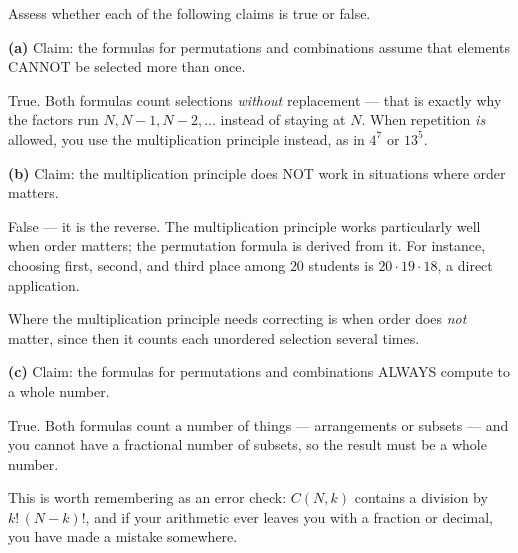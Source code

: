 \documentclass[12pt]{ximera}
\begin{document}
\begin{problem}
Assess whether each of the following claims is true or false.

\begin{prompt}
\textbf{(a)} Claim: the formulas for permutations and combinations assume that
elements CANNOT be selected more than once.

\begin{multipleChoice}
\end{multipleChoice}

\begin{feedback}
True. Both formulas count selections \emph{without} replacement --- that is exactly
why the factors run $N, N-1, N-2,\ldots$ instead of staying at $N$. When repetition
\emph{is} allowed, you use the multiplication principle instead, as in $4^7$ or
$13^5$.
\end{feedback}
\end{prompt}

\begin{prompt}
\textbf{(b)} Claim: the multiplication principle does NOT work in situations where
order matters.

\begin{multipleChoice}
\end{multipleChoice}

\begin{feedback}
False --- it is the reverse. The multiplication principle works particularly well
when order matters; the permutation formula is derived from it. For instance,
choosing first, second, and third place among $20$ students is
$20\cdot 19\cdot 18$, a direct application.

Where the multiplication principle needs correcting is when order does \emph{not}
matter, since then it counts each unordered selection several times.
\end{feedback}
\end{prompt}

\begin{prompt}
\textbf{(c)} Claim: the formulas for permutations and combinations ALWAYS compute to
a whole number.

\begin{multipleChoice}
\end{multipleChoice}

\begin{feedback}
True. Both formulas count a number of things --- arrangements or subsets --- and you
cannot have a fractional number of subsets, so the result must be a whole number.

This is worth remembering as an error check: $C(N,k)$ contains a division by
$k!\,(N-k)!$, and if your arithmetic ever leaves you with a fraction or decimal, you
have made a mistake somewhere.
\end{feedback}
\end{prompt}
\end{problem}
\end{document}
